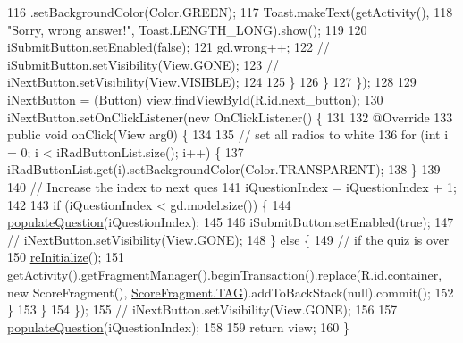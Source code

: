 \begin{DoxyCode}
116                             .setBackgroundColor(Color.GREEN);
117                     Toast.makeText(getActivity(),
118                             \textcolor{stringliteral}{"Sorry, wrong answer!"}, Toast.LENGTH\_LONG).show();
119 
120                     iSubmitButton.setEnabled(\textcolor{keyword}{false});
121                     gd.wrong++;
122                     \textcolor{comment}{// iSubmitButton.setVisibility(View.GONE);}
123                     \textcolor{comment}{// iNextButton.setVisibility(View.VISIBLE);}
124 
125                 \}
126             \}
127         \});
128 
129         iNextButton = (Button) view.findViewById(R.id.next\_button);
130         iNextButton.setOnClickListener(\textcolor{keyword}{new} OnClickListener() \{
131 
132             @Override
133             \textcolor{keyword}{public} \textcolor{keywordtype}{void} onClick(View arg0) \{
134 
135                 \textcolor{comment}{// set all radios to white}
136                 \textcolor{keywordflow}{for} (\textcolor{keywordtype}{int} i = 0; i < iRadButtonList.size(); i++) \{
137                     iRadButtonList.get(i).setBackgroundColor(Color.TRANSPARENT);
138                 \}
139 
140                 \textcolor{comment}{// Increase the index to next ques}
141                 iQuestionIndex = iQuestionIndex + 1;
142 
143                 \textcolor{keywordflow}{if} (iQuestionIndex < gd.model.size()) \{
144                     \hyperlink{classorg_1_1buildmlearn_1_1toolkit_1_1quiztemplate_1_1QuestionFragment_aa7710314d3a07072c8d67e3625826590}{populateQuestion}(iQuestionIndex);
145 
146                     iSubmitButton.setEnabled(\textcolor{keyword}{true});
147                     \textcolor{comment}{// iNextButton.setVisibility(View.GONE);}
148                 \} \textcolor{keywordflow}{else} \{
149                     \textcolor{comment}{// if the quiz is over}
150                     \hyperlink{classorg_1_1buildmlearn_1_1toolkit_1_1quiztemplate_1_1QuestionFragment_a815352bbacc2869c92bf4dfbbf5c3851}{reInitialize}();
151                     getActivity().getFragmentManager().beginTransaction().replace(R.id.container, \textcolor{keyword}{new} 
      ScoreFragment(), \hyperlink{classorg_1_1buildmlearn_1_1toolkit_1_1quiztemplate_1_1ScoreFragment_a0f33e1b8e2e8d4acddb6e2932dbd65ed}{ScoreFragment.TAG}).addToBackStack(null).commit();
152                 \}
153             \}
154         \});
155         \textcolor{comment}{// iNextButton.setVisibility(View.GONE);}
156 
157         \hyperlink{classorg_1_1buildmlearn_1_1toolkit_1_1quiztemplate_1_1QuestionFragment_aa7710314d3a07072c8d67e3625826590}{populateQuestion}(iQuestionIndex);
158 
159         \textcolor{keywordflow}{return} view;
160     \}
\end{DoxyCode}
